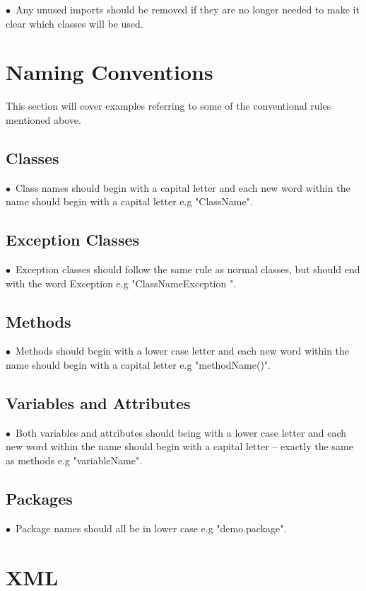 \documentclass[english]{article}
\begin{document}
$\bullet$\ Any unused imports should be removed if they are no longer needed to make it clear which classes will be used.\par


				
			\section{Naming Conventions	}
			This section will cover examples referring to some of the conventional rules mentioned above.
				
					\subsection{ Classes }
$\bullet$\ Class names should begin with a capital letter and each new word within the name should begin with a capital letter e.g "ClassName".\par

				\subsection{Exception Classes}
$\bullet$\ Exception classes should follow the same rule as normal classes, but should end with the word Exception e.g "ClassNameException ".\par
\subsection{Methods}
$\bullet$\ Methods should begin with a lower case letter and each new word within the name should begin with a capital letter e.g "methodName()".\par
\subsection{Variables and Attributes }
$\bullet$\ Both variables and attributes should being with a lower case letter and each new word within the name should begin with a capital letter – exactly the same as methods e.g "variableName".\par
\subsection{Packages}
$\bullet$\ Package names should all be in lower case e.g "demo.package".\par

	\section{XML	}
	
\end{document}
